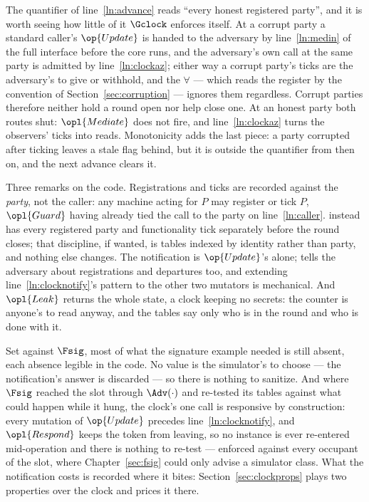 \documentclass[10pt,oneside,openany]{book}
\theoremstyle{accentdef}
\theoremstyle{accentplain}
\begin{document}
The quantifier of line~\ref{ln:advance} reads ``every honest registered party'', and it is worth
seeing how little of it $\Gclock$ enforces itself. At a corrupt party a standard caller's
$\op{Update}$ is handed to the adversary by line~\ref{ln:medin} of the full interface before the
core runs, and the adversary's own call at the same party is admitted by line~\ref{ln:clockaz};
either way a corrupt party's ticks are the adversary's to give or withhold, and the $\forall$ ---
which reads the register by the convention of Section~\ref{sec:corruption} --- ignores them
regardless. Corrupt parties therefore neither hold a round open nor help close one. At an honest
party both routes shut: $\opl{Mediate}$ does not fire, and line~\ref{ln:clockaz} turns the
observers' ticks into reads. Monotonicity adds the last piece: a party corrupted after ticking
leaves a stale flag behind, but it is outside the quantifier from then on, and the next advance
clears it.



Three remarks on the code. Registrations and ticks are recorded against the \emph{party}, not the
caller: any machine acting for $P$ may register or tick $P$, $\opl{Guard}$ having already tied the
call to the party on line~\ref{ln:caller}. \cite{BMTZ17} instead has every registered party and
functionality tick separately before the round closes; that discipline, if wanted, is tables
indexed by identity rather than party, and nothing else changes. The notification is
$\op{Update}$'s alone; \cite{BMTZ17} tells the adversary about registrations and departures too,
and extending line~\ref{ln:clocknotify}'s pattern to the other two mutators is mechanical. And
$\opl{Leak}$ returns the whole state, a clock keeping no secrets: the counter is anyone's to read
anyway, and the tables say only who is in the round and who is done with it.

Set against $\Fsig$, most of what the signature example needed is still absent, each absence
legible in the code. No value is the simulator's to choose --- the notification's answer is
discarded --- so there is nothing to sanitize. And where $\Fsig$ reached the slot through
$\Adv(\cdot)$ and re-tested its tables against what could happen while it hung, the clock's one
call is responsive by construction: every mutation of $\op{Update}$ precedes
line~\ref{ln:clocknotify}, and $\opl{Respond}$ keeps the token from leaving, so no instance is
ever re-entered mid-operation and there is nothing to re-test --- enforced against every occupant
of the slot, where Chapter~\ref{sec:fsig} could only advise a simulator class. What the
notification costs is recorded where it bites: Section~\ref{sec:clockprops} plays two properties
over the clock and prices it there.
\end{document}
